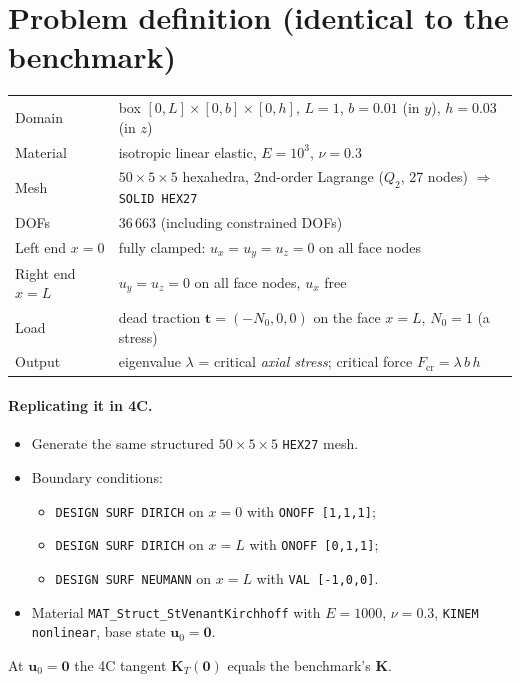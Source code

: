 \documentclass[11pt,a4paper]{report}
\newcommand{\bu}{\bm{u}}
\newcommand{\K}{\mathbf{K}}
\newcommand{\KT}{\mathbf{K}_T}
\begin{document}
\section{Problem definition (identical to the benchmark)}
\begin{center}
\begin{tabular}{@{}ll@{}}
\toprule
Domain & box $[0,L]\times[0,b]\times[0,h]$, $L=1$, $b=0.01$ (in $y$), $h=0.03$ (in $z$) \\
Material & isotropic linear elastic, $E=10^3$, $\nu=0.3$ \\
Mesh & $50\times5\times5$ hexahedra, 2nd-order Lagrange ($Q_2$, 27 nodes) $\Rightarrow$ \texttt{SOLID HEX27} \\
DOFs & 36\,663 (including constrained DOFs) \\
Left end $x=0$ & fully clamped: $u_x=u_y=u_z=0$ on all face nodes \\
Right end $x=L$ & $u_y=u_z=0$ on all face nodes, $u_x$ free \\
Load & dead traction $\bm{t}=(-N_0,0,0)$ on the face $x=L$, $N_0=1$ (a stress) \\
Output & eigenvalue $\lambda$ = critical \emph{axial stress}; critical force $F_\text{cr}=\lambda\,b\,h$ \\
\bottomrule
\end{tabular}
\end{center}

\paragraph{Replicating it in 4C.}
\begin{itemize}
\item Generate the same structured $50\times5\times5$ \texttt{HEX27} mesh.
\item Boundary conditions:
  \begin{itemize}
  \item \texttt{DESIGN SURF DIRICH} on $x=0$ with \texttt{ONOFF [1,1,1]};
  \item \texttt{DESIGN SURF DIRICH} on $x=L$ with \texttt{ONOFF [0,1,1]};
  \item \texttt{DESIGN SURF NEUMANN} on $x=L$ with \texttt{VAL [-1,0,0]}.
  \end{itemize}
\item Material \texttt{MAT\_Struct\_StVenantKirchhoff} with $E=1000$,
  $\nu=0.3$, \texttt{KINEM nonlinear}, base state $\bu_0=\bm{0}$.
\end{itemize}
At $\bu_0=\bm{0}$ the 4C tangent $\KT(\bm{0})$ equals the benchmark's $\K$.
\end{document}
